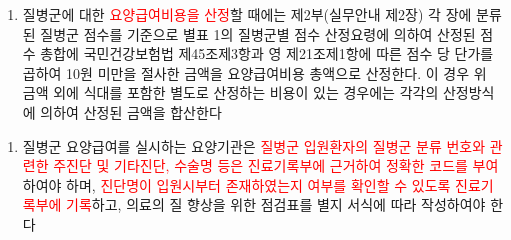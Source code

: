 \begin{myshadowbox}
\begin{enumerate}[5.]\tightlist
\item 질병군에 대한 \textcolor{red}{요양급여비용을 산정}할 때에는 제2부(실무안내 제2장) 각 장에 분류된 질병군 점수를 기준으로 별표 1의 질병군별 점수 산정요령에 의하여 산정된 점수 총합에 국민건강보험법 제45조제3항과 영 제21조제1항에 따른 점수 당 단가를 곱하여 10원 미만을 절사한 금액을 요양급여비용 총액으로 산정한다. 이 경우 위 금액 외에 식대를 포함한 별도로 산정하는 비용이 있는 경우에는 각각의 산정방식에 의하여 산정된 금액을 합산한다
\end{enumerate}
\begin{enumerate}[13.]\tightlist
\item  질병군 요양급여를 실시하는 요양기관은 \textcolor{red}{질병군 입원환자의 질병군 분류 번호와 관련한 주진단 및 기타진단, 수술명 등은 진료기록부에 근거하여 정확한 코드를 부여}하여야 하며, \textcolor{red}{진단명이 입원시부터 존재하였는지 여부를 확인할 수 있도록 진료기록부에 기록}하고, 의료의 질 향상을 위한 점검표를 별지 서식에 따라 작성하여야 한다
\end{enumerate}
\end{myshadowbox}
\prezi{\clearpage}
\par
\medskip

